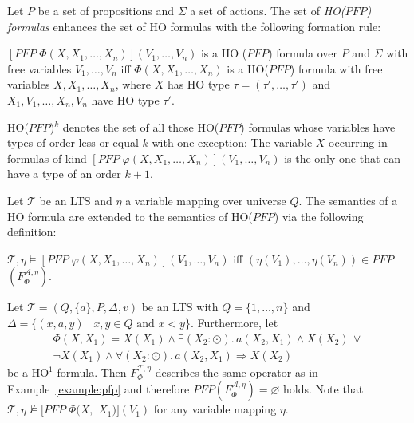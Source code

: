 \begin{definition}
    Let $P$ be a set of propositions and $\Sigma$ a set of actions. The set of \emph{HO($\mathit{PFP}$) formulas} enhances the set of HO formulas with the
    following formation rule:
    \begin{compactitem}
        \item $[\mathit{PFP}\;\Phi(X, X_1, \dots, X_n)](V_1, \dots, V_n)$ is a HO
        ($\mathit{PFP}$) formula over $P$ and $\Sigma$ with free variables $V_1, \dots, V_n$ iff $\Phi(X, X_1, \dots, X_n)
        $ is a HO($\mathit{PFP}$) formula with free variables $X, X_1, \dots, X_n$, where $X$ has HO type $\tau =
        (\tau', \dots, \tau')$ and $X_1, V_1, \dots, X_n, V_n$ have HO type $\tau'$.
    \end{compactitem}
\end{definition}

HO($\mathit{PFP}$)$^k$ denotes the set of all those HO($\mathit{PFP}$) formulas whose variables have types of
order less or equal $k$ with one exception: The variable $X$ occurring in formulas of kind $[\mathit{PFP}\;\varphi(X, X_1, \dots, X_n)](V_1, \dots, V_n)$ is the only one that can have a type of an order $k+1$.

\begin{definition}
    Let $\mathcal{T}$ be an LTS and $\eta$ a variable mapping over universe $Q$. The
    semantics of a HO formula are extended to the semantics of HO($\mathit{PFP}$) via the following definition:
    \begin{compactitem}
        \item $\mathcal{T}, \eta \models [\mathit{PFP}\;\varphi(X, X_1, \dots, X_n)](V_1, \dots,
        V_n)$ iff $(\eta(V_1), \dots, \eta(V_n)) \in \mathit{PFP}$ $(F_\Phi^{\mathcal{A},\eta})$.
    \end{compactitem}
\end{definition}

\begin{example}
\label{example:ho_pfp}
Let $\mathcal{T} = (Q, \{a\}, P, \Delta, v)$ be an LTS with $Q = \{1, \dots, n\}$ and $\Delta = \{(x, a, y) \mid x, y \in Q \text{ and } x < y\}$. Furthermore, let
\begin{align*}
	\Phi(X,X_1) = X(X_1) \wedge \exists (X_2 \colon \odot).\, a(X_2, X_1) \wedge X(X_2)\,\vee \\ 
	\neg X(X_1) \wedge \forall (X_2 \colon \odot).\, a(X_2, X_1) \Rightarrow X(X_2)
\end{align*}
be a HO$^1$ formula. Then $F_\Phi^{\mathcal{T}, \eta}$ describes the same operator as in Example~\ref{example:pfp} and therefore $PFP(F_\Phi^{\mathcal{A},\eta}) = \varnothing$ holds. Note that $\mathcal{T}, \eta \not\models [PFP\; \Phi(X, $ $X_1)](V_1)$ for any variable mapping $\eta$.
\end{example}